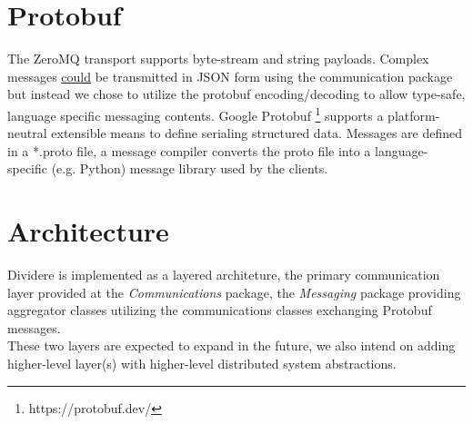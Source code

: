 \documentclass[fontsize=12pt]{book}
\begin{document}
\chapter{Protobuf}
The ZeroMQ transport supports byte-stream and string payloads.  Complex messages \underline{could} be transmitted in JSON form using the communication package but instead we chose to utilize the protobuf encoding/decoding to allow type-safe, language specific messaging contents.  Google Protobuf \footnote{https://protobuf.dev/} supports a platform-neutral extensible means to define serialing structured data.  Messages are defined in a *.proto file, a message compiler converts the proto file into a language-specific (e.g. Python) message library used by the clients.
\\
\chapter{Architecture}

Dividere is implemented as a layered architeture, the primary communication layer provided at the \emph{Communications} package, the \emph{Messaging} package providing aggregator classes utilizing the communications classes exchanging Protobuf messages.  
\\
These two layers are expected to expand in the future, we also intend on adding higher-level layer(s) with higher-level distributed system abstractions.
\\

  {
     \vbox {
      }
     \vbox {
      }
      \vbox {
      }
 } 
\end{document}
